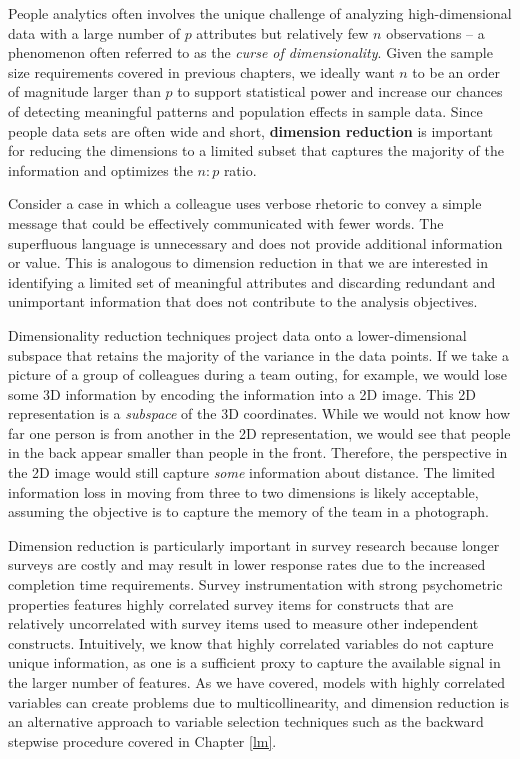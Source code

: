 \documentclass[
]{book}
\begin{document}
People analytics often involves the unique challenge of analyzing high-dimensional data with a large number of \(p\) attributes but relatively few \(n\) observations -- a phenomenon often referred to as the \emph{curse of dimensionality}. Given the sample size requirements covered in previous chapters, we ideally want \(n\) to be an order of magnitude larger than \(p\) to support statistical power and increase our chances of detecting meaningful patterns and population effects in sample data. Since people data sets are often wide and short, \textbf{dimension reduction} is important for reducing the dimensions to a limited subset that captures the majority of the information and optimizes the \(n:p\) ratio.

Consider a case in which a colleague uses verbose rhetoric to convey a simple message that could be effectively communicated with fewer words. The superfluous language is unnecessary and does not provide additional information or value. This is analogous to dimension reduction in that we are interested in identifying a limited set of meaningful attributes and discarding redundant and unimportant information that does not contribute to the analysis objectives.

Dimensionality reduction techniques project data onto a lower-dimensional subspace that retains the majority of the variance in the data points. If we take a picture of a group of colleagues during a team outing, for example, we would lose some 3D information by encoding the information into a 2D image. This 2D representation is a \emph{subspace} of the 3D coordinates. While we would not know how far one person is from another in the 2D representation, we would see that people in the back appear smaller than people in the front. Therefore, the perspective in the 2D image would still capture \emph{some} information about distance. The limited information loss in moving from three to two dimensions is likely acceptable, assuming the objective is to capture the memory of the team in a photograph.

Dimension reduction is particularly important in survey research because longer surveys are costly and may result in lower response rates due to the increased completion time requirements. Survey instrumentation with strong psychometric properties features highly correlated survey items for constructs that are relatively uncorrelated with survey items used to measure other independent constructs. Intuitively, we know that highly correlated variables do not capture unique information, as one is a sufficient proxy to capture the available signal in the larger number of features. As we have covered, models with highly correlated variables can create problems due to multicollinearity, and dimension reduction is an alternative approach to variable selection techniques such as the backward stepwise procedure covered in Chapter \ref{lm}.
\end{document}
